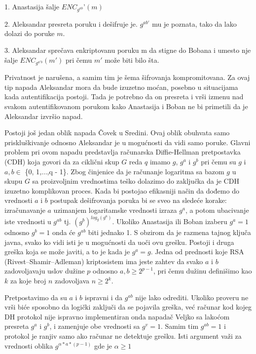 \documentclass[a4paper]{article}
\begin{document}
1. Anastasija šalje $ENC_{g^{ab}}$'$(m)$

2. Aleksandar presreta poruku i dešifruje je. $g^{ab'}$ mu je poznata, tako da lako dolazi do poruke $m$.

3. Aleksandar sprečava enkriptovanu poruku m da stigne do Bobana i umesto nje šalje $ENC_{g^{a'b}}(m')$ pri čemu $m'$ može biti bilo šta. \cite{dhpaper}

Privatnost je narušena, a samim tim je šema šifrovanja kompromitovana. Za ovaj tip napada Aleksandar mora da bude izuzetno moćan, posebno u situacijama kada autentifikacija postoji. Tada je potrebno da on presreta i vrši izmenu nad svakom autentifikovanom porukom kako Anastasija i Boban ne bi primetili da je Aleksandar izvršio napad.

Postoji još jedan oblik napada Čovek u Sredini. Ovaj oblik obuhvata samo priskluškivanje odnosno Aleksandar je u mogućnosti da vidi samo poruke. Glavni problem pri ovom napadu predstavlja računarska Diffie-Hellman pretpostavka (CDH) koja govori da za ciklični skup $G$ reda $q$ imamo $g$, $g^{a}$ i $g^{b}$ pri čemu su $g$ i $a, b\in$ \{0, 1,...,q - 1\}. Zbog činjenice da je računanje logaritma sa bazom $g$ u skupu $G$ sa proizvoljnim vrednostima teško dolazimo do zaključka da je CDH izuzetno komplikovan proces. Kada bi postojao efikasniji način da dođemo do vrednosti $a$ i $b$ postupak dešifrovanja poruka bi se sveo na sledeće korake: izračunavanje $a$ uzimanjem logaritamske vrednosti izraza $g^{a}$, a potom ubacivanje iste vrednosti u $g^{ab}$ tj. $(g^{b})^{log_g(g^{a})}$. \cite{dlproblem}
Ukoliko Anastasija ili Boban izaberu $g^{a}=1$ odnosno $g^{b}=1$ onda će $g^{ab}$ biti jednako 1. S obzirom da je razmena tajnog ključa javna, svako ko vidi isti je u mogućnosti da uoči ovu grešku. Postoji i druga greška koja se može javiti, a to je kada je $g^{a}=g$. Jedna od prednosti koje RSA (Rivest–Shamir–Adleman) kriptosistem ima jeste zahtev da svako $a$ i $b$ zadovoljavaju uslov dužine $p$ odnosno $a,b\geq2^{p-1}$, pri čemu dužinu definišimo kao $k$ za koje broj $n$ zadovoljava $n\geq2^{k}$. 

Pretpostavimo da su $a$ i $b$ ispravni i da $g^{ab}$ nije lako odrediti. Ukoliko proveru ne vrši biće sposobno da logički zaključi da se pojavila greška, već računar kod kojeg DH protokol nije ispravno implementiran onda napadač Veljko sa lakoćom presreta $g^{a}$ i $g^{b}$, i zamenjuje obe vrednosti sa $g^{v}=1$. Samim tim $g^{ab}=1$ i protokol je ranjiv samo ako računar ne detektuje grešku. Isti argument važi za vrednosti oblika $g^{\alpha*a*(p-1)}$ gde je $\alpha\geq1$
\end{document}
